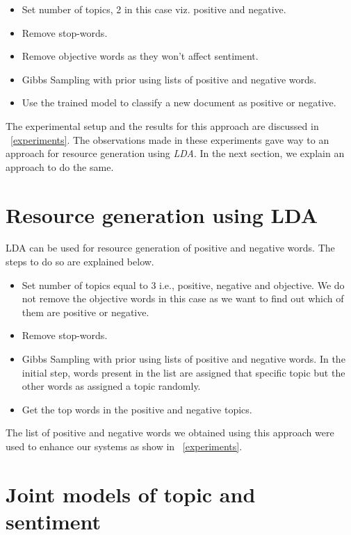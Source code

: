 \begin{itemize}
 \itemsep0em
 \item Set number of topics, 2 in this case viz. positive and negative.
 \item Remove stop-words.
 \item Remove objective words as they won't affect sentiment.
 \item Gibbs Sampling with prior using lists of positive and negative words.
 \item Use the trained model to classify a new document as positive or negative.
\end{itemize}

The experimental setup and the results for this approach are discussed in ~\cref{experiments}. The observations made in these
experiments gave way to an approach for resource generation using \textit{LDA}. In the next section, we explain an approach
to do the same.

\section{Resource generation using LDA}

LDA can be used for resource generation of positive and negative words. The steps to do so are explained below.

\begin{itemize}
 \itemsep0em
 \item Set number of topics equal to 3 i.e., positive, negative and objective. We do not remove the objective
 words in this case as we want to find out which of them are positive or negative.
 \item Remove stop-words.
 \item Gibbs Sampling with prior using lists of positive and negative words. In the initial step, words present 
 in the list are assigned that specific topic but the other words as assigned a topic randomly.
 \item Get the top words in the positive and negative topics.
\end{itemize}

The list of positive and negative words we obtained using this approach were used to enhance our systems as show in ~\cref{experiments}.

\section{Joint models of topic and sentiment}

